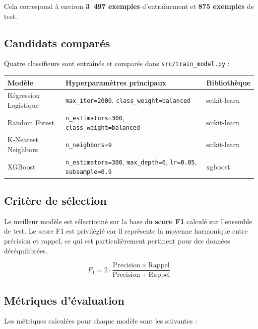 \documentclass[11pt,a4paper]{article}
\begin{document}
Cela correspond à environ \textbf{3~497 exemples} d'entraînement et \textbf{875 exemples} de test.

\subsection{Candidats comparés}

Quatre classifieurs sont entraînés et comparés dans \texttt{src/train\_model.py} :

\begin{center}
\begin{tabular}{L{3.5cm} L{8cm} C{2cm}}
\toprule
\textbf{Modèle} & \textbf{Hyperparamètres principaux} & \textbf{Bibliothèque} \\
\midrule
Régression Logistique & \texttt{max\_iter=2000}, \texttt{class\_weight=balanced} & scikit-learn \\
Random Forest & \texttt{n\_estimators=300}, \texttt{class\_weight=balanced} & scikit-learn \\
K-Nearest Neighbors & \texttt{n\_neighbors=9} & scikit-learn \\
XGBoost & \texttt{n\_estimators=300}, \texttt{max\_depth=6}, \texttt{lr=0.05}, \texttt{subsample=0.9} & xgboost \\
\bottomrule
\end{tabular}
\end{center}

\subsection{Critère de sélection}

Le meilleur modèle est sélectionné sur la base du \textbf{score F1} calculé sur l'ensemble de test. Le score F1 est privilégié car il représente la moyenne harmonique entre précision et rappel, ce qui est particulièrement pertinent pour des données déséquilibrées.

$$F_1 = 2 \cdot \frac{\mathrm{Precision} \times \mathrm{Rappel}}{\mathrm{Precision} + \mathrm{Rappel}}$$

\subsection{Métriques d'évaluation}

Les métriques calculées pour chaque modèle sont les suivantes :
\end{document}
